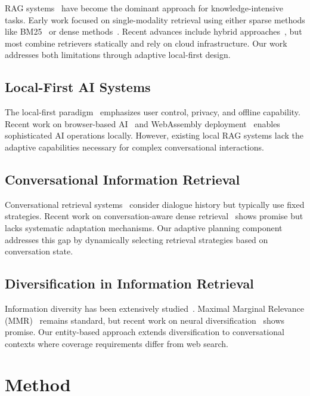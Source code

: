 \documentclass[letterpaper]{article}
\begin{document}
RAG systems~\cite{lewis2020retrieval} have become the dominant approach for knowledge-intensive tasks. Early work focused on single-modality retrieval using either sparse methods like BM25~\cite{robertson2009probabilistic} or dense methods~\cite{karpukhin2020dense}. Recent advances include hybrid approaches~\cite{ma2023finedtuning}, but most combine retrievers statically and rely on cloud infrastructure. Our work addresses both limitations through adaptive local-first design.

\subsection{Local-First AI Systems}

The local-first paradigm~\cite{kleppmann2019local} emphasizes user control, privacy, and offline capability. Recent work on browser-based AI~\cite{gokaslan2023openelm} and WebAssembly deployment~\cite{haas2017bringing} enables sophisticated AI operations locally. However, existing local RAG systems lack the adaptive capabilities necessary for complex conversational interactions.

\subsection{Conversational Information Retrieval}

Conversational retrieval systems~\cite{qu2020open} consider dialogue history but typically use fixed strategies. Recent work on conversation-aware dense retrieval~\cite{yu2021few} shows promise but lacks systematic adaptation mechanisms. Our adaptive planning component addresses this gap by dynamically selecting retrieval strategies based on conversation state.

\subsection{Diversification in Information Retrieval}

Information diversity has been extensively studied~\cite{carbonell1998maximal,zhang2008avoiding}. Maximal Marginal Relevance (MMR)~\cite{carbonell1998maximal} remains standard, but recent work on neural diversification~\cite{ma2023finedtuning} shows promise. Our entity-based approach extends diversification to conversational contexts where coverage requirements differ from web search.

\section{Method}
\end{document}
